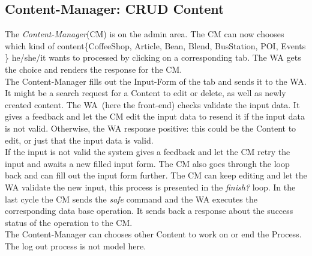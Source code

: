 \subsection{Content-Manager: CRUD Content}
The \textit{Content-Manager}(CM) is on the admin area.
The CM can now chooses which kind of content\{CoffeeShop, Article, Bean, Blend, BusStation, POI, Events \} he/she/it wants to processed by clicking on a corresponding tab. The WA gets the choice and renders the response for the CM.\\
The Content-Manager fills out the Input-Form of the tab and sends it to the WA. It might be a search request for a Content to edit or delete, as well as newly created content. The WA~(here the front-end) checks validate the input data. It gives a feedback and let the CM edit the input data to resend it if the input data is not valid. Otherwise, the WA response positive: this could be the Content to edit, or just that the input data is valid.\\
If the input is not valid the system gives a feedback and let the CM retry the input and awaits a new filled input form. The CM also goes through the loop back and can fill out the input form further.  The CM can keep editing and let the WA validate the new input, this process is presented in the \textit{finish?} loop. In the last cycle the CM sends the \textit{safe} command and the WA executes the corresponding data base operation. It sends back a response about the success status of the operation to  the CM.\\
The Content-Manager can chooses other Content to work on or end the Process. The log out process is not model here.


